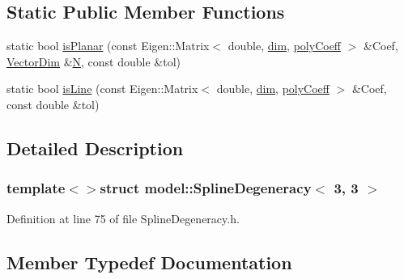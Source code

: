 \subsection*{Static Public Member Functions}
\begin{DoxyCompactItemize}
\item 
static bool \hyperlink{structmodel_1_1_spline_degeneracy_3_013_00_013_01_4_a8159a2e58240ae57f84770c892ad4f24}{is\+Planar} (const Eigen\+::\+Matrix$<$ double, \hyperlink{structmodel_1_1_spline_degeneracy_3_013_00_013_01_4_a3572507efca566685b67cf5412b870c6a56bf1ade339b58476d01e9aa1dc7a292}{dim}, \hyperlink{structmodel_1_1_spline_degeneracy_3_013_00_013_01_4_a67aec3b68581303ee6db8cbafe79b983a5604efb1d99abff2a208ea3a83bc2699}{poly\+Coeff} $>$ \&Coef, \hyperlink{structmodel_1_1_spline_degeneracy_3_013_00_013_01_4_a58d2053b56b3f1a8cce4c07098c0039a}{Vector\+Dim} \&\hyperlink{thompson__tetrahedron_8m_a7823765a845eb81829f110d8337f81ae}{N}, const double \&tol)
\item 
static bool \hyperlink{structmodel_1_1_spline_degeneracy_3_013_00_013_01_4_a4b0c803bd5f34607bb2a5c48065c3267}{is\+Line} (const Eigen\+::\+Matrix$<$ double, \hyperlink{structmodel_1_1_spline_degeneracy_3_013_00_013_01_4_a3572507efca566685b67cf5412b870c6a56bf1ade339b58476d01e9aa1dc7a292}{dim}, \hyperlink{structmodel_1_1_spline_degeneracy_3_013_00_013_01_4_a67aec3b68581303ee6db8cbafe79b983a5604efb1d99abff2a208ea3a83bc2699}{poly\+Coeff} $>$ \&Coef, const double \&tol)
\end{DoxyCompactItemize}


\subsection{Detailed Description}
\subsubsection*{template$<$$>$struct model\+::\+Spline\+Degeneracy$<$ 3, 3 $>$}



Definition at line 75 of file Spline\+Degeneracy.\+h.



\subsection{Member Typedef Documentation}
\hypertarget{structmodel_1_1_spline_degeneracy_3_013_00_013_01_4_a016b56948871fb7d1c223f8ccb6b9f70}{}

